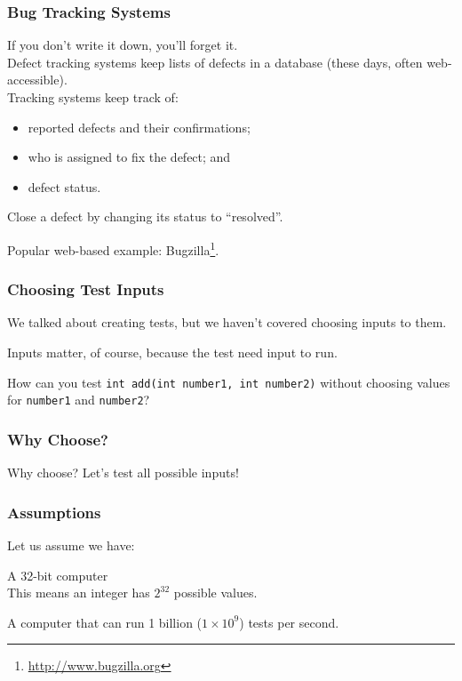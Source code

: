 \begin{frame}
\frametitle{Bug Tracking Systems}

\begin{changemargin}{1cm}

If you don't write it down, you'll forget it. \\[1em]

Defect tracking systems
keep lists of defects in a database (these days, often
web-accessible).\\[1em]

Tracking systems keep track of:
\begin{itemize}
\item reported defects and
their confirmations; 
\item who is assigned to fix the defect; and 
\item defect
status.
\end{itemize} Close a defect
by changing its status to ``resolved''.

Popular web-based example: Bugzilla\footnote{\url{http://www.bugzilla.org}}.

\end{changemargin}

\end{frame}

\begin{frame}
\frametitle{Choosing Test Inputs}
\begin{changemargin}{1cm}
We talked about creating tests, but we haven't covered choosing inputs to them.

Inputs matter, of course, because the test need input to run.

How can you test \texttt{int add(int number1, int number2)} without choosing values for
\texttt{number1} and \texttt{number2}?
\end{changemargin}
\end{frame}

\begin{frame}
\frametitle{Why Choose?}
\begin{changemargin}{1cm}

Why choose? Let's test all possible inputs!


\end{changemargin}
\end{frame}


\begin{frame}
\frametitle{Assumptions}
\begin{changemargin}{1cm}
Let us assume we have:

A 32-bit computer\\
	\quad This means an integer has $2^{32}$ possible values.

A computer that can run 1 billion ($1\times10^{9}$) tests per second.

\end{changemargin}
\end{frame}


